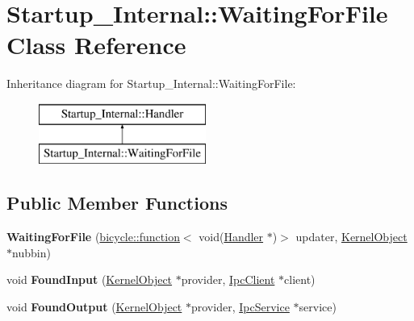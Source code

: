 \hypertarget{class_startup___internal_1_1_waiting_for_file}{}\section{Startup\+\_\+\+Internal\+:\+:Waiting\+For\+File Class Reference}
\label{class_startup___internal_1_1_waiting_for_file}
Inheritance diagram for Startup\+\_\+\+Internal\+:\+:Waiting\+For\+File\+:\begin{figure}[H]
\begin{center}
\leavevmode
\includegraphics[height=2.000000cm]{class_startup___internal_1_1_waiting_for_file}
\end{center}
\end{figure}
\subsection*{Public Member Functions}
\begin{DoxyCompactItemize}
\item 
\mbox{\label{class_startup___internal_1_1_waiting_for_file_a590378f712124e54bdb760677deef6c1}} 
{\bfseries Waiting\+For\+File} (\hyperlink{classbicycle_1_1function}{bicycle\+::function}$<$ void(\hyperlink{class_startup___internal_1_1_handler}{Handler} $\ast$)$>$ updater, \hyperlink{class_kernel_object}{Kernel\+Object} $\ast$nubbin)
\item 
\mbox{\label{class_startup___internal_1_1_waiting_for_file_a38477a0df86a12faed6aadc4dfa732e1}} 
void {\bfseries Found\+Input} (\hyperlink{class_kernel_object}{Kernel\+Object} $\ast$provider, \hyperlink{class_ipc_client}{Ipc\+Client} $\ast$client)
\item 
\mbox{\label{class_startup___internal_1_1_waiting_for_file_abd0fcf559564ebcbffc169f6e1c44950}} 
void {\bfseries Found\+Output} (\hyperlink{class_kernel_object}{Kernel\+Object} $\ast$provider, \hyperlink{class_ipc_service}{Ipc\+Service} $\ast$service)
\end{DoxyCompactItemize}
